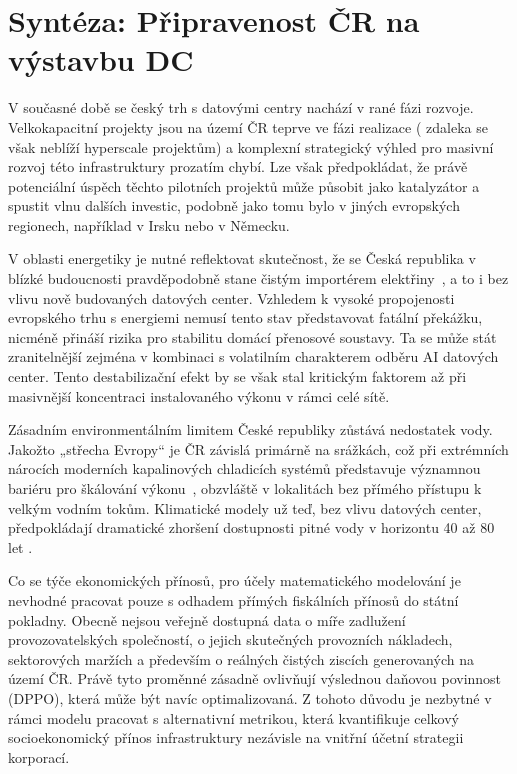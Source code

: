 \section{Syntéza: Připravenost ČR na výstavbu DC}
\label{sec:cz_syntéza}


V současné době se český trh s datovými centry nachází v rané fázi rozvoje. Velkokapacitní projekty jsou na území ČR teprve ve fázi realizace ( zdaleka se však neblíží hyperscale projektům) a komplexní strategický výhled pro masivní rozvoj této infrastruktury prozatím chybí. Lze však předpokládat, že právě potenciální úspěch těchto pilotních projektů může působit jako katalyzátor a spustit vlnu dalších investic, podobně jako tomu bylo v jiných evropských regionech, například v Irsku nebo v Německu.

V oblasti energetiky je nutné reflektovat skutečnost, že se Česká republika v blízké budoucnosti pravděpodobně stane čistým importérem elektřiny~\cite{chlub}, a to i bez vlivu nově budovaných datových center. Vzhledem k vysoké propojenosti evropského trhu s energiemi nemusí tento stav představovat fatální překážku, nicméně přináší rizika pro stabilitu domácí přenosové soustavy. Ta se může stát zranitelnější zejména v kombinaci s volatilním charakterem odběru AI datových center. Tento destabilizační efekt by se však stal kritickým faktorem až při masivnější koncentraci instalovaného výkonu v rámci celé sítě.

Zásadním environmentálním limitem České republiky zůstává nedostatek vody. Jakožto „střecha Evropy“ je ČR závislá primárně na srážkách, což při extrémních nárocích moderních kapalinových chladicích systémů představuje významnou bariéru pro škálování výkonu~\cite{li_making_2025}, obzvláště v lokalitách bez přímého přístupu k velkým vodním tokům. Klimatické modely už teď, bez vlivu datových center, předpokládají dramatické zhoršení dostupnosti pitné vody v horizontu 40 až 80 let \cite{mullerova_water_2024}.

Co se týče ekonomických přínosů, pro účely matematického modelování je nevhodné pracovat pouze s odhadem přímých fiskálních přínosů do státní pokladny. Obecně nejsou veřejně dostupná data o míře zadlužení provozovatelských společností, o jejich skutečných provozních nákladech, sektorových maržích a především o reálných čistých ziscích generovaných na území ČR. Právě tyto proměnné zásadně ovlivňují výslednou daňovou povinnost (DPPO), která může být navíc optimalizovaná. Z tohoto důvodu je nezbytné v rámci modelu pracovat s alternativní metrikou, která kvantifikuje celkový socioekonomický přínos infrastruktury nezávisle na vnitřní účetní strategii korporací.
